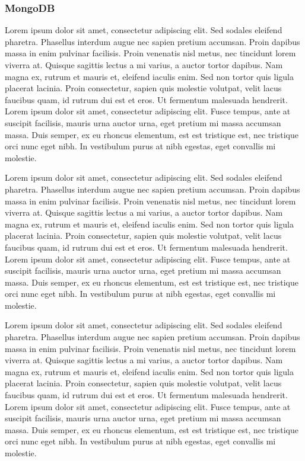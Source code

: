 \subsubsection{MongoDB}
Lorem ipsum dolor sit amet, consectetur adipiscing elit. Sed sodales
eleifend pharetra. Phasellus interdum augue nec sapien pretium accumsan.
Proin dapibus massa in enim pulvinar facilisis. Proin venenatis nisl metus,
nec tincidunt lorem viverra at. Quisque sagittis lectus a mi varius, a
auctor tortor dapibus. Nam magna ex, rutrum et mauris et, eleifend iaculis
enim. Sed non tortor quis ligula placerat lacinia. Proin consectetur, sapien
quis molestie volutpat, velit lacus faucibus quam, id rutrum dui est et
eros. Ut fermentum malesuada hendrerit. Lorem ipsum dolor sit amet,
consectetur adipiscing elit. Fusce tempus, ante at suscipit facilisis,
mauris urna auctor urna, eget pretium mi massa accumsan massa. Duis semper,
ex eu rhoncus elementum, est est tristique est, nec tristique orci nunc eget
nibh. In vestibulum purus at nibh egestas, eget convallis mi molestie.

Lorem ipsum dolor sit amet, consectetur adipiscing elit. Sed sodales
eleifend pharetra. Phasellus interdum augue nec sapien pretium accumsan.
Proin dapibus massa in enim pulvinar facilisis. Proin venenatis nisl metus,
nec tincidunt lorem viverra at. Quisque sagittis lectus a mi varius, a
auctor tortor dapibus. Nam magna ex, rutrum et mauris et, eleifend iaculis
enim. Sed non tortor quis ligula placerat lacinia. Proin consectetur, sapien
quis molestie volutpat, velit lacus faucibus quam, id rutrum dui est et
eros. Ut fermentum malesuada hendrerit. Lorem ipsum dolor sit amet,
consectetur adipiscing elit. Fusce tempus, ante at suscipit facilisis,
mauris urna auctor urna, eget pretium mi massa accumsan massa. Duis semper,
ex eu rhoncus elementum, est est tristique est, nec tristique orci nunc eget
nibh. In vestibulum purus at nibh egestas, eget convallis mi molestie.

Lorem ipsum dolor sit amet, consectetur adipiscing elit. Sed sodales
eleifend pharetra. Phasellus interdum augue nec sapien pretium accumsan.
Proin dapibus massa in enim pulvinar facilisis. Proin venenatis nisl metus,
nec tincidunt lorem viverra at. Quisque sagittis lectus a mi varius, a
auctor tortor dapibus. Nam magna ex, rutrum et mauris et, eleifend iaculis
enim. Sed non tortor quis ligula placerat lacinia. Proin consectetur, sapien
quis molestie volutpat, velit lacus faucibus quam, id rutrum dui est et
eros. Ut fermentum malesuada hendrerit. Lorem ipsum dolor sit amet,
consectetur adipiscing elit. Fusce tempus, ante at suscipit facilisis,
mauris urna auctor urna, eget pretium mi massa accumsan massa. Duis semper,
ex eu rhoncus elementum, est est tristique est, nec tristique orci nunc eget
nibh. In vestibulum purus at nibh egestas, eget convallis mi molestie.


